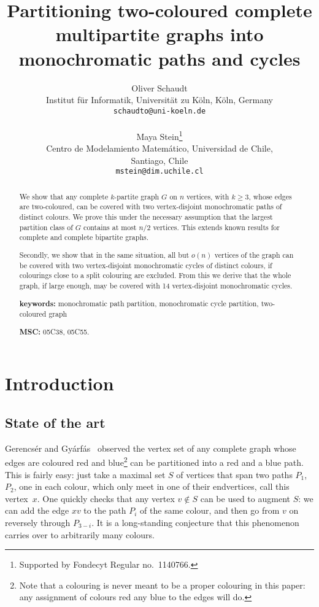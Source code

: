 \documentclass[a4paper,10pt]{article}
\title{Partitioning two-coloured complete multipartite graphs into monochromatic paths and cycles}
\author{Oliver Schaudt\\
Institut f\"ur Informatik, Universit\"at zu K\"oln, K\"oln, Germany\\
\texttt{schaudto@uni-koeln.de}\\~\\
Maya Stein\thanks{Supported by Fondecyt Regular no.~1140766.}\\
Centro de Modelamiento Matem\'atico, Universidad de Chile,\\ 
Santiago, Chile\\
\texttt{mstein@dim.uchile.cl}}
\begin{document}
\newtheorem{theorem}{Theorem}[section]
\newtheorem{lemma}[theorem]{Lemma}
\newtheorem{observation}[theorem]{Observation}
\newtheorem{corollary}[theorem]{Corollary}
\newtheorem{claim}[theorem]{Claim}
\newtheorem{conjecture}[theorem]{Conjecture}
\newtheorem{problem}[theorem]{Problem}

\maketitle

\begin{abstract}
\noindent 
We show that any complete $k$-partite graph $G$ on $n$ vertices, with $k \ge 3$, whose edges are two-coloured, can be covered with two vertex-disjoint monochromatic paths of distinct colours.
We prove this under the necessary assumption that the largest partition class of $G$ contains at most $n/2$ vertices.
This extends known results for complete and complete bipartite graphs.

Secondly, we show that in the same situation, all but $o(n)$ vertices of the graph can be covered with two vertex-disjoint monochromatic cycles of distinct colours, if colourings close to a split colouring are excluded.
From this we derive that the whole graph, if large enough, may be covered with 14 vertex-disjoint monochromatic cycles.

\noindent \textbf{keywords:} monochromatic path partition, monochromatic cycle partition, two-coloured graph

\noindent \textbf{MSC:} 05C38, 05C55.
\end{abstract}

\section{Introduction}
\subsection{State of the art}

Gerencs\'er and Gy\'arf\'as~\cite{GG67} observed the vertex set of any complete graph whose edges are coloured red and blue\footnote{Note that a colouring is never meant to be a proper colouring in this paper: any assignment of colours red any blue to the edges will do.} can be partitioned into a red and a blue path. This is fairly easy: just take a maximal set $S$ of vertices that span two paths $P_1$, $P_2$, one in each colour, which only meet in one of their endvertices, call this vertex~$x$. One quickly checks that any vertex $v\notin S$ can be used to augment $S$: we can add the edge $xv$ to the path $P_i$ of the same colour, and then go from $v$ on reversely through $P_{3-i}$.
It is a long-standing conjecture that this phenomenon carries over to arbitrarily many colours.
\end{document}
